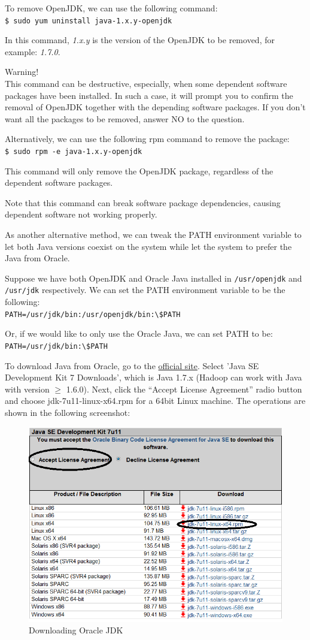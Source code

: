 To remove OpenJDK, we can use the following command: \\
\verb|$ sudo yum uninstall java-1.x.y-openjdk|

In this command, \emph{1.x.y} is the version of the OpenJDK to be removed, for example: \emph{1.7.0}.

\begin{warning}
Warning! \\
This command can be destructive, especially, when some dependent software packages have been installed. In such a case, it will prompt you to confirm the removal of OpenJDK together with the depending software packages. If you don't want all the packages to be removed, answer NO to the question.
\end{warning}

Alternatively, we can use the following rpm command to remove the package:\\
\verb|$ sudo rpm -e java-1.x.y-openjdk|

This command will only remove the OpenJDK package, regardless of the dependent software packages.

Note that this command can break software package dependencies, causing dependent software not working properly.

As another alternative method, we can tweak the PATH environment variable to let both Java versions coexist on the system while let the system to prefer the Java from Oracle.

Suppose we have both OpenJDK and Oracle Java installed in \verb|/usr/openjdk| and \verb|/usr/jdk| respectively. We can set the PATH environment variable to be the following: \\
\verb|PATH=/usr/jdk/bin:/usr/openjdk/bin:\$PATH|

Or, if we would like to only use the Oracle Java, we can set PATH to be: \\
\verb|PATH=/usr/jdk/bin:\$PATH|

To download Java from Oracle, go to the \href{http://www.oracle.com/technetwork/java/javase/downloads/index.html}{official site}. Select 'Java SE Development Kit 7 Downloads', which is Java 1.7.x (Hadoop can work with Java with version $\ge$ 1.6.0). Next, click the ``Accept License Agreement'' radio button and choose jdk-7u11-linux-x64.rpm for a 64bit Linux machine. The operations are shown in the following screenshot:

\begin{figure}[h]
  \centering
  \includegraphics[width=.6\textwidth]{figs/5163OS_02_04.png}
  \caption{Downloading Oracle JDK}\label{fig:oracle.jdk}
\end{figure} 

